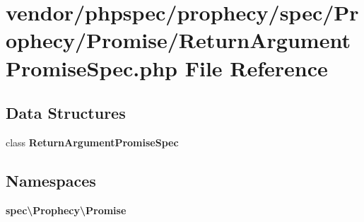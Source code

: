 \section{vendor/phpspec/prophecy/spec/\+Prophecy/\+Promise/\+Return\+Argument\+Promise\+Spec.php File Reference}
\label{_return_argument_promise_spec_8php}
\subsection*{Data Structures}
\begin{DoxyCompactItemize}
\item 
class {\bf Return\+Argument\+Promise\+Spec}
\end{DoxyCompactItemize}
\subsection*{Namespaces}
\begin{DoxyCompactItemize}
\item 
 {\bf spec\textbackslash{}\+Prophecy\textbackslash{}\+Promise}
\end{DoxyCompactItemize}
